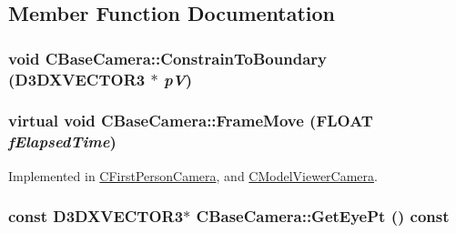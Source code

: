 \subsection{Member Function Documentation}
\hypertarget{class_c_base_camera_a1d888b7ae8d6c49ee564720bcaee2e95}{
\subsubsection[{ConstrainToBoundary}]{\setlength{\rightskip}{0pt plus 5cm}void CBaseCamera::ConstrainToBoundary (D3DXVECTOR3 $\ast$ {\em pV})}}
\label{class_c_base_camera_a1d888b7ae8d6c49ee564720bcaee2e95}
\hypertarget{class_c_base_camera_a21db15a8cdca60d1540d958a32708703}{
\subsubsection[{FrameMove}]{\setlength{\rightskip}{0pt plus 5cm}virtual void CBaseCamera::FrameMove (FLOAT {\em fElapsedTime})}}
\label{class_c_base_camera_a21db15a8cdca60d1540d958a32708703}


Implemented in \hyperlink{class_c_first_person_camera_a86e482e92a7a17db600e82ad9a29ca01}{CFirstPersonCamera}, and \hyperlink{class_c_model_viewer_camera_a5309ad1ff0044124c05737da466b7315}{CModelViewerCamera}.\hypertarget{class_c_base_camera_ae08632cf51cc263cdd2d78eea8af442a}{
\subsubsection[{GetEyePt}]{\setlength{\rightskip}{0pt plus 5cm}const D3DXVECTOR3$\ast$ CBaseCamera::GetEyePt () const}}
\label{class_c_base_camera_ae08632cf51cc263cdd2d78eea8af442a}


